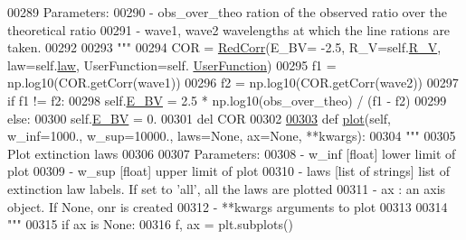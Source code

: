 \begin{DoxyCode}
00289 \textcolor{stringliteral}{        Parameters:}
00290 \textcolor{stringliteral}{            - obs\_over\_theo    ration of the observed ratio over the theoretical ratio}
00291 \textcolor{stringliteral}{            - wave1, wave2     wavelengths at which the line rations are taken.}
00292 \textcolor{stringliteral}{}
00293 \textcolor{stringliteral}{        """}
00294         COR = \hyperlink{classpyneb_1_1extinction_1_1red__corr_1_1_red_corr}{RedCorr}(E\_BV= -2.5, R\_V=self.\hyperlink{classpyneb_1_1extinction_1_1red__corr_1_1_red_corr_a4696ecdd84c912c20e6aa19b1573e875}{R\_V}, law=self.\hyperlink{classpyneb_1_1extinction_1_1red__corr_1_1_red_corr_adfed423013315bad4ba5dda2368dc3d0}{law}, UserFunction=self.
      \hyperlink{classpyneb_1_1extinction_1_1red__corr_1_1_red_corr_a41b35235a0952185b3c7e34f6835511e}{UserFunction})
00295         f1 = np.log10(COR.getCorr(wave1))
00296         f2 = np.log10(COR.getCorr(wave2))
00297         \textcolor{keywordflow}{if} f1 != f2:
00298             self.\hyperlink{classpyneb_1_1extinction_1_1red__corr_1_1_red_corr_a0bc581bcaa8eeeb67b83ffdec58bf164}{E\_BV} = 2.5 * np.log10(obs\_over\_theo) / (f1 - f2)
00299         \textcolor{keywordflow}{else}:
00300             self.\hyperlink{classpyneb_1_1extinction_1_1red__corr_1_1_red_corr_a0bc581bcaa8eeeb67b83ffdec58bf164}{E\_BV} = 0.
00301         del COR
00302 
\hypertarget{red__corr_8py_source_l00303}{}\hyperlink{classpyneb_1_1extinction_1_1red__corr_1_1_red_corr_aa0348dcba9bf9bbdb3296191319c683c}{00303}     \textcolor{keyword}{def }\hyperlink{classpyneb_1_1extinction_1_1red__corr_1_1_red_corr_aa0348dcba9bf9bbdb3296191319c683c}{plot}(self, w\_inf=1000., w\_sup=10000., laws=None, ax=None, **kwargs):
00304         \textcolor{stringliteral}{"""}
00305 \textcolor{stringliteral}{        Plot extinction laws}
00306 \textcolor{stringliteral}{}
00307 \textcolor{stringliteral}{        Parameters:}
00308 \textcolor{stringliteral}{            - w\_inf [float] lower limit of plot}
00309 \textcolor{stringliteral}{            - w\_sup [float] upper limit of plot}
00310 \textcolor{stringliteral}{            - laws [list of strings] list of extinction law labels. If set to 'all', all the laws are
       plotted}
00311 \textcolor{stringliteral}{            - ax : an axis object. If None, onr is created}
00312 \textcolor{stringliteral}{            - **kwargs arguments to plot}
00313 \textcolor{stringliteral}{}
00314 \textcolor{stringliteral}{        """}
00315         \textcolor{keywordflow}{if} ax \textcolor{keywordflow}{is} \textcolor{keywordtype}{None}:
00316             f, ax = plt.subplots()

\end{DoxyCode}
